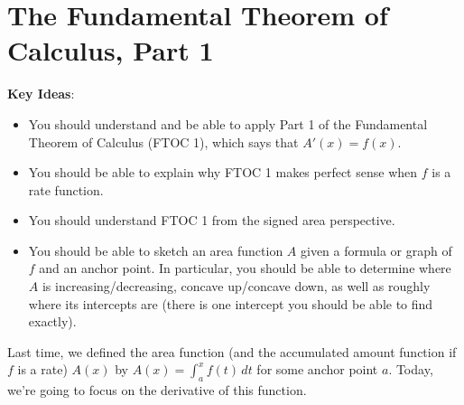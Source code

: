 \documentclass[main]{subfiles}
\begin{document}
\ifSubfilesClassLoaded{%
  \chaptermark{\chapterfive}
}{}

\section{The Fundamental Theorem of Calculus, Part 1} \label{ws5-5}

\begin{problemonly}
    \begin{framed}

\textbf{Key Ideas}:

\begin{itemize}[topsep=0pt,partopsep=0pt,parsep=8pt,itemsep=0pt]

\item You should understand and be able to apply Part 1 of the Fundamental
  Theorem of Calculus (FTOC 1), which says that $A'(x) = f(x)$.

\item You should be able to explain why FTOC 1 makes perfect sense when
  $f$ is a rate function.

\item You should understand FTOC 1 from the signed area perspective.

\item You should be able to sketch an area function $A$ given a
  formula or graph of $f$ and an anchor point.
  In particular, you should be able to determine
  where $A$ is increasing/decreasing, concave up/concave down, as
  well as roughly where its intercepts are (there is one intercept you
  should be able to find exactly). 

\end{itemize}
\end{framed}
\end{problemonly}

Last time, we defined the area function (and the 
accumulated amount
function if $f$ is a rate) $A(x)$ by
  $\displaystyle A(x) = \int_a^x f(t)\,dt$ for some anchor point $a$.
  Today, we're going to
  focus on the derivative of this function.
\end{document}
